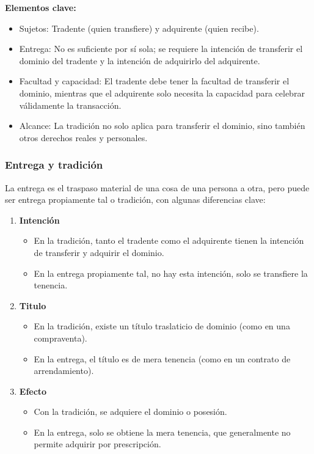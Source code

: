 \documentclass{templateNote}
\begin{document}
\noindent\textbf{Elementos clave:}
\begin{itemize}
    \item Sujetos: Tradente (quien transfiere) y adquirente (quien recibe).
    \item Entrega: No es suficiente por sí sola; se requiere la intención de transferir el dominio del tradente y la intención de adquirirlo del adquirente.
    \item Facultad y capacidad: El tradente debe tener la facultad de transferir el dominio, mientras que el adquirente solo necesita la capacidad para celebrar válidamente la transacción.
    \item Alcance: La tradición no solo aplica para transferir el dominio, sino también otros derechos reales y personales.
\end{itemize}

\subsubsection{Entrega y tradición}
La entrega es el traspaso material de una cosa de una persona a otra, pero puede ser entrega propiamente tal o tradición, con algunas diferencias clave:

\begin{enumerate}
    \item \textbf{Intención}
    \begin{itemize}
        \item En la tradición, tanto el tradente como el adquirente tienen la intención de transferir y adquirir el dominio.
        \item En la entrega propiamente tal, no hay esta intención, solo se transfiere la tenencia.
    \end{itemize}
    \item \textbf{Titulo}
    \begin{itemize}
        \item En la tradición, existe un título traslaticio de dominio (como en una compraventa).
        \item En la entrega, el título es de mera tenencia (como en un contrato de arrendamiento).
    \end{itemize}
    \item \textbf{Efecto}
    \begin{itemize}
        \item Con la tradición, se adquiere el dominio o posesión.
        \item En la entrega, solo se obtiene la mera tenencia, que generalmente no permite adquirir por prescripción.
    \end{itemize}
\end{enumerate}
\end{document}
